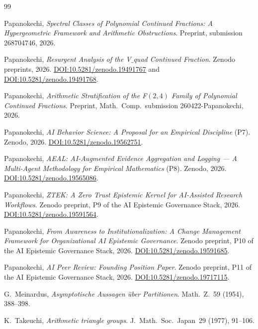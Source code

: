 \documentclass[12pt]{amsart}
\theoremstyle{definition}
\begin{document}
\begin{thebibliography}{99}

Papanokechi, \emph{Spectral Classes of Polynomial Continued Fractions:
A Hypergeometric Framework and Arithmetic Obstructions}.
Preprint, submission 268704746, 2026.

Papanokechi, \emph{Resurgent Analysis of the V$\_$quad Continued
Fraction}.
Zenodo preprints, 2026.
\href{https://doi.org/10.5281/zenodo.19491767}
{DOI:10.5281/zenodo.19491767} and
\href{https://doi.org/10.5281/zenodo.19491768}
{DOI:10.5281/zenodo.19491768}.

Papanokechi, \emph{Arithmetic Stratification of the F$(2,4)$ Family of
Polynomial Continued Fractions}.
Preprint, Math.~Comp.\ submission 260422-Papanokechi, 2026.

Papanokechi, \emph{AI Behavior Science: A Proposal for an Empirical
Discipline} (P7). Zenodo, 2026.
\href{https://doi.org/10.5281/zenodo.19562751}
{DOI:10.5281/zenodo.19562751}.

Papanokechi, \emph{AEAL: AI-Augmented Evidence Aggregation and
Logging --- A Multi-Agent Methodology for Empirical Mathematics} (P8).
Zenodo, 2026.
\href{https://doi.org/10.5281/zenodo.19565086}
{DOI:10.5281/zenodo.19565086}.

Papanokechi, \emph{ZTEK: A Zero Trust Epistemic Kernel for AI-Assisted
Research Workflows}. Zenodo preprint, P9 of the AI Epistemic Governance
Stack, 2026.
\href{https://doi.org/10.5281/zenodo.19591564}
{DOI:10.5281/zenodo.19591564}.

Papanokechi, \emph{From Awareness to Institutionalization: A Change
Management Framework for Organizational AI Epistemic Governance}.
Zenodo preprint, P10 of the AI Epistemic Governance Stack, 2026.
\href{https://doi.org/10.5281/zenodo.19591685}
{DOI:10.5281/zenodo.19591685}.

Papanokechi, \emph{AI Peer Review: Founding Position Paper}.
Zenodo preprint, P11 of the AI Epistemic Governance Stack, 2026.
\href{https://doi.org/10.5281/zenodo.19717115}
{DOI:10.5281/zenodo.19717115}.

G.~Meinardus, \emph{Asymptotische Aussagen \"uber Partitionen}.
Math.~Z.~59 (1954), 388--398.

K.~Takeuchi, \emph{Arithmetic triangle groups}.
J.~Math.~Soc.~Japan~29 (1977), 91--106.


\end{thebibliography}
\end{document}
